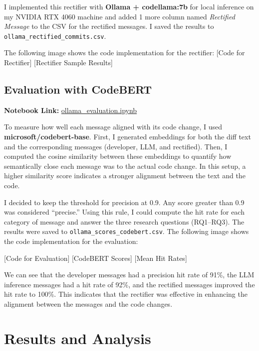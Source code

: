 \documentclass[10pt,a4paper]{report}
\begin{document}
I implemented this rectifier with \textbf{Ollama + codellama:7b} for local inference on my NVIDIA RTX 4060 machine and added 1 more column named \textit{Rectified Message} to the CSV for the rectified messages. I saved the results to \texttt{ollama\_rectified\_commits.csv}.

The following image shows the code implementation for the rectifier:
[Code for Rectifier]
[Rectifier Sample Results]



\subsection{Evaluation with CodeBERT}
\textbf{Notebook Link:} \href{https://github.com/ShardulJunagade/cs202-stt/blob/main/lab2/ollama_evaluation.ipynb}{ollama\_evaluation.ipynb}

To measure how well each message aligned with its code change, I used \textbf{microsoft/codebert-base}. First, I generated embeddings for both the diff text and the corresponding messages (developer, LLM, and rectified). Then, I computed the cosine similarity between these embeddings to quantify how semantically close each message was to the actual code change. In this setup, a higher similarity score indicates a stronger alignment between the text and the code.

I decided to keep the threshold for precision at 0.9. Any score greater than 0.9 was considered “precise.” Using this rule, I could compute the hit rate for each category of message and answer the three research questions (RQ1–RQ3). The results were saved to \texttt{ollama\_scores\_codebert.csv}. The following image shows the code implementation for the evaluation:

[Code for Evaluation]
[CodeBERT Scores]
[Mean Hit Rates]

We can see that the developer messages had a precision hit rate of 91\%, the LLM inference messages had a hit rate of 92\%, and the rectified messages improved the hit rate to 100\%. This indicates that the rectifier was effective in enhancing the alignment between the messages and the code changes.

\section{Results and Analysis}
\end{document}

